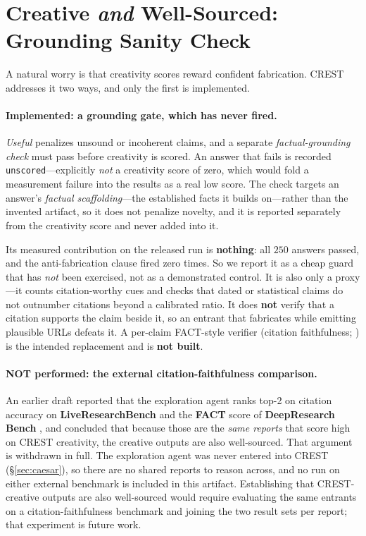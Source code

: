 \section{Creative \emph{and} Well-Sourced: Grounding Sanity Check}
\label{sec:grounding}

A natural worry is that creativity scores reward confident fabrication. CREST addresses it two ways,
and only the first is implemented.

\paragraph{Implemented: a grounding gate, which has never fired.} \emph{Useful} penalizes unsound or
incoherent claims, and a separate \emph{factual-grounding check} must pass before creativity is
scored. An answer that fails is recorded \texttt{unscored}---explicitly \emph{not} a creativity score
of zero, which would fold a measurement failure into the results as a real low score. The check
targets an answer's \emph{factual scaffolding}---the established facts it builds on---rather than the
invented artifact, so it does not penalize novelty, and it is reported separately from the creativity
score and never added into it.

Its measured contribution on the released run is \textbf{nothing}: all $250$ answers passed, and the
anti-fabrication clause fired zero times. So we report it as a cheap guard that has \emph{not} been
exercised, not as a demonstrated control. It is also only a proxy---it counts citation-worthy cues
and checks that dated or statistical claims do not outnumber citations beyond a calibrated ratio. It
does \textbf{not} verify that a citation supports the claim beside it, so an entrant that fabricates
while emitting plausible URLs defeats it. A per-claim FACT-style verifier (citation faithfulness;
\citealp{gao2023alce,rashkin2023ais,min2023factscore}) is the intended replacement and is
\textbf{not built}.

\paragraph{NOT performed: the external citation-faithfulness comparison.} An earlier draft reported
that the exploration agent ranks top-2 on citation accuracy on \textbf{LiveResearchBench}
\citep{liveresearchbench2025} and the \textbf{FACT} score of \textbf{DeepResearch Bench}
\citep{du2025deepresearchbench}, and concluded that because those are the \emph{same reports} that
score high on CREST creativity, the creative outputs are also well-sourced. That argument is
withdrawn in full. The exploration agent was never entered into CREST (\S\ref{sec:caesar}), so there
are no shared reports to reason across, and no run on either external benchmark is included in this
artifact. Establishing that CREST-creative outputs are also well-sourced would require evaluating
the same entrants on a citation-faithfulness benchmark and joining the two result sets per report;
that experiment is future work.
